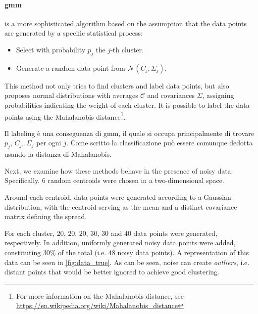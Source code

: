 \paragraph{\gls{gmm}} is a more sophisticated algorithm based on the assumption that the data points are generated by a specific statistical process:
\begin{itemize}
    \item[1] Select with probability $p_j$ the $j$-th cluster.
    \item[2] Generate a random data point from $\mathcal{N}(C_j, \Sigma_j)$.
\end{itemize}
This method not only tries to find clusters and label data points, but also proposes normal distributions with averages $\mathcal{C}$ and covariances $\Sigma$, assigning probabilities indicating the weight of each cluster. It is possible to label the data points using the Mahalanobis distance\footnote{For more information on the Mahalanobis distance, see \url{https://en.wikipedia.org/wiki/Mahalanobis_distance}}.
\begin{note}
	Il labeling è una conseguenza di \gls{gmm}, il quale si occupa principalmente di trovare $p_j$, $C_j$, $\Sigma_j$ per ogni $j$. Come scritto la classificazione può essere comunque dedotta usando la distanza di Mahalanobis.
\end{note}

\bigskip
Next, we examine how these methods behave in the presence of noisy data. Specifically, $6$ random centroids were chosen in a two-dimensional space. \begin{modified} Around each centroid, data points were generated according to a Gaussian distribution, with the centroid serving as the mean and a distinct covariance matrix defining the spread. \end{modified} For each cluster, $20$, $20$, $20$, $30$, $30$ and $40$ data points were generated, respectively. In addition, uniformly generated noisy data points were added, constituting $30\%$ of the total (i.e. $48$ noisy data points). A representation of this data can be seen in \cref{fig:data_true}. As can be seen, noise can create \textit{outliers}, i.e. distant points that would be better ignored to achieve good clustering.

